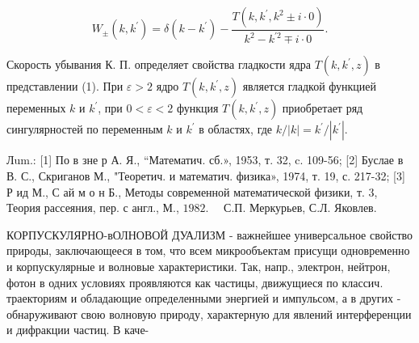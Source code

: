 \documentclass[10pt]{article}
\begin{document}
\[

W_{ \pm}\left(k, k^{\prime}\right)=\delta\left(k-k^{\prime}\right)-\frac{T\left(k, k^{\prime}, k^{2} \pm i \cdot 0\right)}{k^{2}-k^{\prime 2} \mp i \cdot 0} .

\]



Скорость убывания К. П. определяет свойства гладкости ядра $T\left(k, k^{\prime}, z\right)$ в представлении (1). При $\varepsilon>2$ ядро $T\left(k, k^{\prime}, z\right)$ является гладкой функцией переменных $k$ и $k^{\prime}$, при $0<\varepsilon<2$ функция $T\left(k, k^{\prime}, z\right)$ приобретает ряд сингулярностей по переменным $k$ и $k^{\prime}$ в областях, где $k /|k|=k^{\prime} /\left|k^{\prime}\right|$.



Лum.: [1] По в зне р А. Я., “Математич. сб.», 1953, т. 32, c. 109-56; [2] Буслае в В. С., Скриганов М., "Теоретич. и математич. физика», 1974, т. 19, с. 217-32; [3] Р ид М., С ай м о н Б., Методы современной математической физики, т. 3, Теория рассеяния, пер. с англ., М., $1982 . \quad$ С.П. Меркурьев, С.Л. Яковлев.



КОРПУСКУЛЯРНО-вОЛНОВОЙ ДУАЛИЗМ - важнейшее универсальное свойство природы, заключающееся в том, что всем микрообъектам присущи одновременно и корпускулярные и волновые характеристики. Так, напр., электрон, нейтрон, фотон в одних условиях проявляются как частицы, движущиеся по классич. траекториям и обладающие определенными энергией и импульсом, а в других - обнаруживают свою волновую природу, характерную для явлений интерференции и дифракции частиц. В каче-
\end{document}
